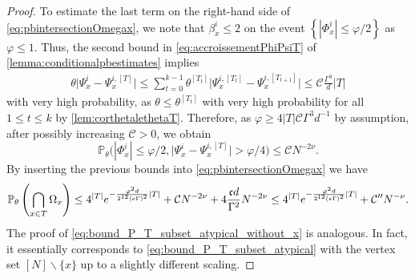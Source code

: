\documentclass[11pt]{article}
\newcommand{\abs}[1]{\left| #1 \right|}
\newcommand{\ccc}{\mathfrak{c}}
\theoremstyle{plain}
\theoremstyle{remark}
\numberwithin{equation}{section}
\newcommand*\bset[1]{[#1]}
\newcommand{\nc}{\normalcolor}
\begin{document}
\begin{proof}
 To estimate the last term on the right-hand side of \cref{eq:pbintersectionOmegax}, we note that $\beta^{i}_x\le 2$ on the event $\left\{ \abs{\Phi^{i}_x} \le \varphi/2 \right\}$ as $\varphi \le 1$. Thus, the second bound in \cref{eq:accroissementPhiPsiT} of \cref{lemma:conditionalpbestimates} implies
		\begin{align*}
			\theta \bigl| \Psi_{x}^{i} - \Psi_{x}^{i,\bset{T}}\bigr| \le \sum_{t=0}^{k-1} \theta^{\bset{T_t}}\bigl| \Psi_{x}^{i, \bset{T_{t}}} - \Psi_{x}^{i,\bset{T_{t+1}}}\bigr| \le \mathcal{C} \frac{\Gamma^3}{d} \abs{T} 
		\end{align*}
		with very high probability, as 
		$\theta \le \theta^{\bset{T_t}}  $ with very high probability for all $ 1 \le t \le k $ by  \cref{lem:corthetalethetaT}.
 Therefore, as $\varphi \geq 4 \abs{T} \mathcal C \Gamma^{3} d^{-1}$ by assumption,
 after possibly increasing  $\mathcal{C}>0$, we obtain 
		\begin{equation*}
			\mathbb{P}_{\theta} \big( \abs{\Phi^{i}_x} \le \varphi/2,\bigl| \Psi_{x}^{i} - \Psi_{x}^{i,\bset{T}}\bigr| > \varphi/4 \big) \le \mathcal{C} N^{-2\nu}.
		\end{equation*}
		By inserting the previous bounds into \cref{eq:pbintersectionOmegax} we have
		\begin{equation*}
			\mathbb{P}_{\theta}\left( \bigcap_{x \in T}\Omega_x\right) \le   4^{|T|} e^{-\frac{\varphi^2d}{2^{12} (e\Gamma)^2}|T|}  +  \mathcal{C}N^{-2\nu}+  4 \frac{\ccc d}{\Gamma^2} N^{-2 \nu} \le 4^{|T|} e^{-\frac{\varphi^2d}{2^{12} (e\Gamma)^2}|T|} \nc+ \mathcal{C}^{\prime\prime}N^{-\nu}. 
		\end{equation*}
		The proof of \cref{eq:bound_P_T_subset_atypical_without_x} is analogous. In fact, it essentially corresponds to \cref{eq:bound_P_T_subset_atypical} with the vertex set $[N]\backslash\{x\}$ up to a slightly different scaling.   
	\end{proof}
		
\end{document}
